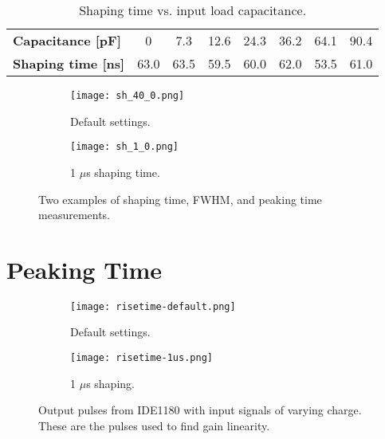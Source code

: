 \documentclass[../main/thesis.tex]{subfiles}
\begin{document}
\begin{table}[h!]
	\begin{center}
		\caption{Shaping time vs. input load capacitance.}
		\label{tab-ide-shaping-c}
		\begin{tabular}{lccccccc}\toprule
			\textbf{Capacitance [pF]}      & 0    & 7.3    & 12.6    & 24.3    & 36.2    & 64.1 & 90.4   \\ 
			\textbf{Shaping time [ns]} & 63.0 & 63.5 & 59.5 & 60.0 & 62.0 & 53.5 & 61.0   \\ \bottomrule
		\end{tabular}
	\end{center}
\end{table}

\begin{figure} [h!]%
	\centering
	\begin{subfigure}{.5\textwidth}
		\centering
		\texttt{[image: sh\_40\_0.png]}
		\caption{Default settings.}
		\label{fig-shape-40-0-}
	\end{subfigure}%
	\begin{subfigure}{.5\textwidth}
		\centering
		\texttt{[image: sh\_1\_0.png]}
		\caption{1 $\mu$s shaping time.}
		\label{fig-shape-1-0-} 
	\end{subfigure}
	\caption{Two examples of shaping time, \gls{FWHM}, and peaking time measurements.}
	\label{fig-shape-example}
\end{figure}

\section{Peaking Time}
\label{ide-risetime}

\begin{figure}
	\centering
	\begin{subfigure}{.5\textwidth}
		\centering
		\texttt{[image: risetime-default.png]}
		\caption{Default settings.}
		\label{fig-IDE1180-risetime-def}
	\end{subfigure}%
	\begin{subfigure}{.5\textwidth}
		\centering
		\texttt{[image: risetime-1us.png]}
		\caption{1 $\mu$s shaping.}
		\label{fig-IDE1180-risetime-1us} 
	\end{subfigure}
	\caption{Output pulses from IDE1180 with input signals of varying charge. These are the pulses used to find gain linearity.}
	\label{fig-IDE1180-risetime}
\end{figure}
\end{document}
